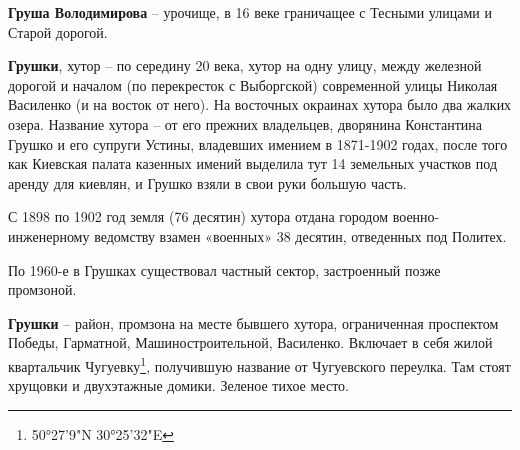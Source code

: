 \medskip

\textbf{Груша Володимирова} – урочище, в 16 веке граничащее с Тесными улицами и Старой дорогой.\\

\medskip

\textbf{Грушки}, хутор – по середину 20 века, хутор на одну улицу, между железной дорогой и началом (по перекресток с Выборгской) современной улицы Николая Василенко (и на восток от него). На восточных окраинах хутора было два жалких озера. Название хутора – от его прежних владельцев, дворянина Константина Грушко и его супруги Устины, владевших имением в 1871-1902 годах, после того как Киевская палата казенных имений выделила тут 14 земельных участков под аренду для киевлян, и Грушко взяли в свои руки большую часть. 

С 1898 по 1902 год земля (76 десятин) хутора отдана городом военно-инженерному ведомству взамен «военных» 38 десятин, отведенных под Политех.

По 1960-е в Грушках существовал частный сектор, застроенный позже промзоной.\\

\medskip

\textbf{Грушки} – район, промзона на месте бывшего хутора, ограниченная проспектом Победы, Гарматной, Машиностроительной, Василенко. Включает в себя жилой квартальчик Чугуевку\footnote{50°27'9"N 30°25'32"E}, получившую название от Чугуевского переулка. Там стоят хрущовки и двухэтажные домики. Зеленое тихое место.
